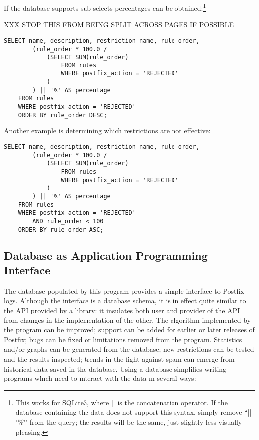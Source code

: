 \documentclass[a4paper,12pt,draft]{article}
\begin{document}
If the database supports sub-selects percentages can be
obtained:\footnote{This works for SQLite3, where || is the concatenation
operator.  If the database containing the data does not support
this syntax, simply remove ``|| '\%\''' from the query; the results will be
the same, just slightly less visually pleasing.}

XXX STOP THIS FROM BEING SPLIT ACROSS PAGES IF POSSIBLE

\begin{verbatim}
SELECT name, description, restriction_name, rule_order,
        (rule_order * 100.0 /
            (SELECT SUM(rule_order)
                FROM rules
                WHERE postfix_action = 'REJECTED'
            )
        ) || '%' AS percentage
    FROM rules
    WHERE postfix_action = 'REJECTED'
    ORDER BY rule_order DESC;
\end{verbatim}

Another example is determining which restrictions are not effective:

\begin{verbatim}
SELECT name, description, restriction_name, rule_order,
        (rule_order * 100.0 /
            (SELECT SUM(rule_order)
                FROM rules
                WHERE postfix_action = 'REJECTED'
            )
        ) || '%' AS percentage
    FROM rules
    WHERE postfix_action = 'REJECTED'
        AND rule_order < 100
    ORDER BY rule_order ASC;
\end{verbatim}

\subsection{Database as Application Programming Interface}

The database populated by this program provides a simple interface to
Postfix logs.  Although the interface is a database schema, it is in effect
quite similar to the API provided by a library: it insulates both user and
provider of the API from changes in the implementation of the other.  The
algorithm implemented by the program can be improved; support can be added
for earlier or later releases of Postfix; bugs can be fixed or limitations
removed from the program.  Statistics and/or graphs can be generated from
the database; new restrictions can be tested and the results inspected;
trends in the fight against spam can emerge from historical data saved in
the database.  Using a database simplifies writing programs which need to
interact with the data in several ways:
\end{document}
